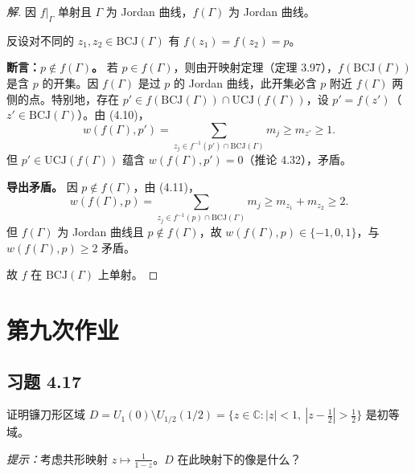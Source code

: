\documentclass[11pt,a4paper]{article}
\newcommand{\C}{\mathbb{C}}
\theoremstyle{definition}
\newenvironment{solution}{\begin{proof}[解]}{\end{proof}}
\begin{document}
\begin{solution}
  因 $f|_\Gamma$ 单射且 $\Gamma$ 为 Jordan 曲线，$f(\Gamma)$ 为 Jordan 曲线。

  反设对不同的 $z_1, z_2 \in \mathrm{BCJ}(\Gamma)$ 有 $f(z_1) = f(z_2) = p$。

  \textbf{断言：$p \notin f(\Gamma)$。}\;
  若 $p \in f(\Gamma)$，则由开映射定理（定理 3.97），$f(\mathrm{BCJ}(\Gamma))$ 是含 $p$ 的开集。因 $f(\Gamma)$ 是过 $p$ 的 Jordan 曲线，此开集必含 $p$ 附近 $f(\Gamma)$ 两侧的点。特别地，存在 $p' \in f(\mathrm{BCJ}(\Gamma)) \cap \mathrm{UCJ}(f(\Gamma))$，设 $p' = f(z')$（$z' \in \mathrm{BCJ}(\Gamma)$）。由 (4.10)，
  \[
    w(f(\Gamma), p')
    = \sum_{z_j \in f^{-1}(p') \cap \mathrm{BCJ}(\Gamma)} m_j
    \ge m_{z'} \ge 1.
  \]
  但 $p' \in \mathrm{UCJ}(f(\Gamma))$ 蕴含 $w(f(\Gamma), p') = 0$（推论 4.32），矛盾。

  \textbf{导出矛盾。}\;
  因 $p \notin f(\Gamma)$，由 (4.11)，
  \[
    w(f(\Gamma), p)
    = \sum_{z_j \in f^{-1}(p) \cap \mathrm{BCJ}(\Gamma)} m_j
    \ge m_{z_1} + m_{z_2} \ge 2.
  \]
  但 $f(\Gamma)$ 为 Jordan 曲线且 $p \notin f(\Gamma)$，故 $w(f(\Gamma), p) \in \{-1, 0, 1\}$，与 $w(f(\Gamma), p) \ge 2$ 矛盾。

  故 $f$ 在 $\mathrm{BCJ}(\Gamma)$ 上单射。\qedhere
\end{solution}

\section{第九次作业}

\subsection{习题 4.17}

证明镰刀形区域
$D = U_1(0) \setminus U_{1/2}(1/2)
= \{z \in \C : |z| < 1,\ |z - \tfrac{1}{2}| > \tfrac{1}{2}\}$
是初等域。

\textit{提示：}考虑共形映射 $z \mapsto \frac{1}{1-z}$。$D$ 在此映射下的像是什么？
\end{document}
